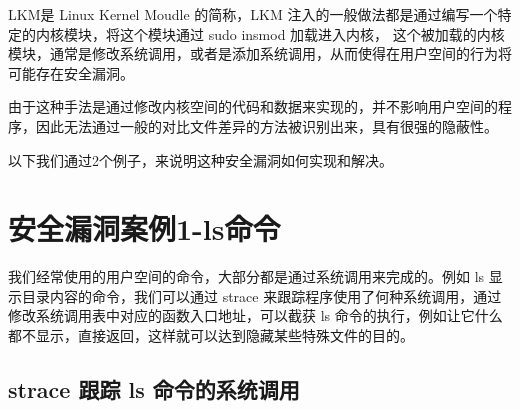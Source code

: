 LKM是 Linux Kernel Moudle 的简称，LKM
注入的一般做法都是通过编写一个特定的内核模块，将这个模块通过 sudo insmod
加载进入内核，
这个被加载的内核模块，通常是修改系统调用，或者是添加系统调用，从而使得在用户空间的行为将可能存在安全漏洞。

由于这种手法是通过修改内核空间的代码和数据来实现的，并不影响用户空间的程序，因此无法通过一般的对比文件差异的方法被识别出来，具有很强的隐蔽性。

以下我们通过2个例子，来说明这种安全漏洞如何实现和解决。

\section{安全漏洞案例1-ls命令}

我们经常使用的用户空间的命令，大部分都是通过系统调用来完成的。例如 ls
显示目录内容的命令，我们可以通过 strace
来跟踪程序使用了何种系统调用，通过修改系统调用表中对应的函数入口地址，可以截获
ls
命令的执行，例如让它什么都不显示，直接返回，这样就可以达到隐藏某些特殊文件的目的。

\subsection{strace 跟踪 ls 命令的系统调用}

